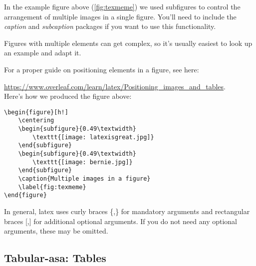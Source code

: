 In the example figure above (\ref{fig:texmeme}) we used subfigures to control the arrangement of multiple images in a single figure. You'll need to include the \textit{caption} and \textit{subcaption} packages if you want to use this functionality. 

Figures with multiple elements can get complex, so it's usually easiest to look up an example and adapt it.

For a proper guide on positioning elements in a figure, see here:

\url{https://www.overleaf.com/learn/latex/Positioning_images_and_tables}.\\

Here's how we produced the figure above:

\begin{verbatim}
\begin{figure}[h!]
    \centering
    \begin{subfigure}{0.49\textwidth}
        \texttt{[image: latexisgreat.jpg]}
    \end{subfigure}
    \begin{subfigure}{0.49\textwidth}
        \texttt{[image: bernie.jpg]}
    \end{subfigure}
    \caption{Multiple images in a figure}
    \label{fig:texmeme}
\end{figure}

\end{verbatim}

In general, latex uses curly braces \{,\} for mandatory arguments and rectangular braces [,] for additional optional arguments. If you do not need any optional arguments, these may be omitted.

\subsection{Tabular-asa: Tables}

